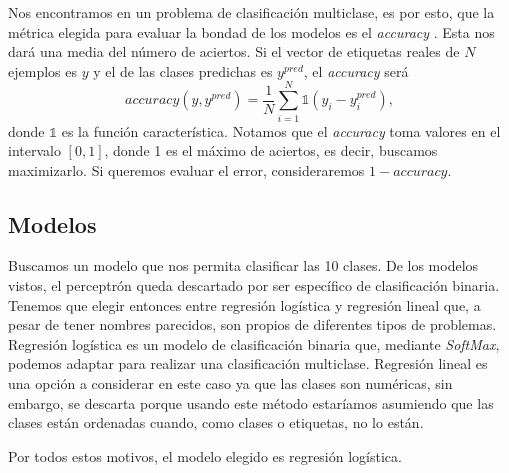 \documentclass[a4paper, 20pt]{article}
\begin{document}
{Nos encontramos en un problema de clasificación multiclase, es por esto, que la métrica elegida para evaluar la bondad de los modelos es el \textit{accuracy} \cite{acc}. Esta nos dará una media del número de aciertos. Si el vector de etiquetas reales de $N$ ejemplos es $y$ y el de las clases predichas es $y^{pred}$, el \textit{accuracy} será\[
accuracy(y, y^{pred}) = \frac{1}{N}\sum_{i=1}^N\mathbb{1}(y_i - y_i^{pred}),
\]
donde $\mathbb{1}$ es la función característica. Notamos que el \textit{accuracy} toma valores en el intervalo $[0,1]$, donde 1 es el máximo de aciertos, es decir, buscamos maximizarlo. Si queremos evaluar el error, consideraremos $1-accuracy$.

\subsection{Modelos}
Buscamos un modelo que nos permita clasificar las 10 clases. De los modelos vistos, el perceptrón queda descartado por ser específico de clasificación binaria. Tenemos que elegir entonces entre regresión logística y regresión lineal que, a pesar de tener nombres parecidos, son propios de diferentes tipos de problemas. Regresión logística es un modelo de clasificación binaria que, mediante \textit{SoftMax}, podemos adaptar para realizar una clasificación multiclase. Regresión lineal es una opción a considerar en este caso ya que las clases son numéricas, sin embargo, se descarta porque usando este método estaríamos asumiendo que las clases están ordenadas cuando, como clases o etiquetas, no lo están.

Por todos estos motivos, el modelo elegido es regresión logística.

}
\end{document}
